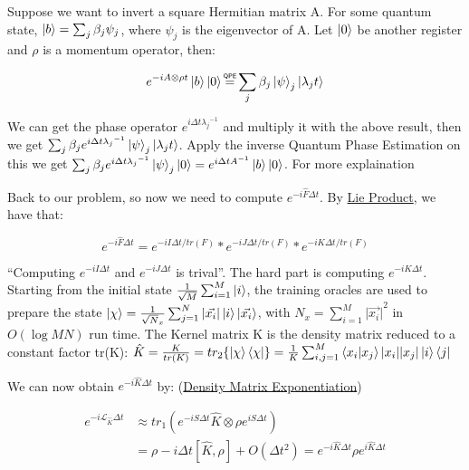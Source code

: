 \documentclass[11pt]{article}
\newcommand\myeq{\mathrel{\overset{\makebox[0pt]{\mbox{\normalfont\tiny\sffamily QPE}}}{=}}}
\begin{document}
Suppose we want to invert a square Hermitian matrix A. For some quantum state, $\ket{b} = \sum_{j} \beta_{j} \psi_{j}$, where $\psi_{j}$ is the eigenvector of A. Let $\ket{0}$ be another register and $\rho$ is a momentum operator, then:

$$e^{-iA \otimes \rho t} \ket{b} \ket{0} \myeq \sum_{j} \beta_{j} \ket{\psi}_{j}  \ket{\lambda_{j} t}$$

We can get the phase operator $e^{i \Delta t {\lambda_{j}}^{-1}}$ and multiply it with the above result, then we get $\sum_{j} \beta_{j} e^{i \Delta t {\lambda_{j}}^{-1}} \ket{\psi}_{j}  \ket{\lambda_{j} t}$. Apply the inverse Quantum Phase Estimation on this we get $\sum_{j} \beta_{j} e^{i \Delta t {\lambda_{j}}^{-1}} \ket{\psi}_{j}  \ket{0} = e ^{i \Delta t A^{-1}} \ket{b} \ket{0}$. For more explaination

Back to our problem, so now we need to compute $e^{-i\hat{F} \Delta t}$. By  \href{https://en.wikipedia.org/wiki/Lie_product_formula}{Lie Product}, we have that: 

$$e^{-i\hat{F} \Delta t} = e^{{-i I \Delta t}/tr(F)} * e^{{-i J  \Delta t}/tr(F)} * e^{{-i K \Delta t}/tr(F)}$$

``Computing $ e^{-i I \Delta t}$ and $ e^{-i J  \Delta t}$ is trival''. The hard part is computing $e^{-i K \Delta t}$. \\

Starting from the initial state $\frac{1}{\sqrt{M}} \sum_{i = 1}^{M} \ket{i}$, the training oracles are used to prepare the state $\ket{\chi} = \frac{1}{\sqrt N_{x}} \sum_{j = 1}^{N} \vert \vec{x_{i}} \vert \ket{i} \ket{\vec{x_{i}}}$, with $N_{x} = \sum_{i=1}^{M} {\vert \vec{x_{i}} \vert}^{2}$ in $O(\log MN)$ run time. The Kernel matrix K is the density matrix reduced to a constant factor tr(K): 
$\hat{K} = \frac{K}{tr(K)} = tr_{2}\{\ket{\chi} \bra{\chi}\} = \frac{1}{K} \sum_{i,j = 1}^{M} \bra{x_{i}}\ket{x_{j}} \vert x_{i} \vert \vert x_{j} \vert \ket{i}\bra{j}$

We can now obtain $e^{-i \hat{K} \Delta t}$ by: (\href{https://arxiv.org/abs/1307.0401}{Density Matrix Exponentiation})

\begin{equation}
\begin{split}
e^{-i \mathcal{L}_{\hat{K}} \Delta t} &\approx tr_{1}(e^{-i S \Delta t} \hat{K} \otimes \rho e^{i S \Delta t}) \\
&= \rho - i \Delta t[\hat{K}, \rho]+ O(\Delta t^{2}) = e^{-i \hat{K} \Delta t} \rho e^{i \hat{K} \Delta t} 
\end{split}
\end{equation}
\end{document}
